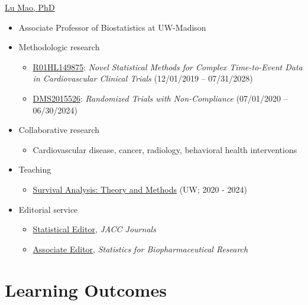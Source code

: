 \documentclass[
  letterpaper,
  DIV=11,
  numbers=noendperiod]{scrreprt}
\providecommand{\tightlist}{%
  \setlength{\itemsep}{0pt}\setlength{\parskip}{0pt}}\usepackage{longtable,booktabs,array}
\begin{document}

\href{https://sites.google.com/view/lmaowisc}{Lu Mao, PhD}

\begin{itemize}
\tightlist
\item
  Associate Professor of Biostatistics at UW-Madison
\item
  Methodologic research

  \begin{itemize}
  \tightlist
  \item
    \href{https://reporter.nih.gov/search/9aSu5u3xlE26GrjbF_4cBg/project-details/10734551}{R01HL149875}:
    \emph{Novel Statistical Methods for Complex Time-to-Event Data in
    Cardiovascular Clinical Trials} (12/01/2019 -- 07/31/2028)
  \item
    \href{https://www.nsf.gov/awardsearch/showAward?AWD_ID=2015526}{DMS2015526}:
    \emph{Randomized Trials with Non-Compliance} (07/01/2020 --
    06/30/2024)
  \end{itemize}
\item
  Collaborative research

  \begin{itemize}
  \tightlist
  \item
    Cardiovascular disease, cancer, radiology, behavioral health
    interventions
  \end{itemize}
\item
  Teaching

  \begin{itemize}
  \tightlist
  \item
    \href{https://lmaowisc.github.io/BMI741}{Survival Analysis: Theory
    and Methods} (UW; 2020 - 2024)
  \end{itemize}
\item
  Editorial service

  \begin{itemize}
  \tightlist
  \item
    \href{https://www.jacc.org/journal/heart-failure/editorial-board}{Statistical
    Editor}, \emph{JACC Journals}
  \item
    \href{https://www.tandfonline.com/action/journalInformation?show=editorialBoard\&journalCode=usbr20}{Associate
    Editor}, \emph{Statistics for Biopharmaceutical Research}
  \end{itemize}
\end{itemize}

\hypertarget{learning-outcomes}{%
\section*{Learning Outcomes}\label{learning-outcomes}}
\end{document}
